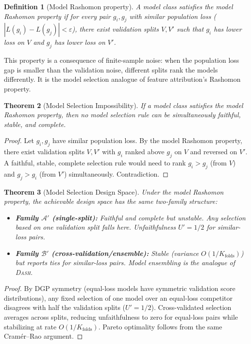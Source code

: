 \documentclass{article}
\newtheorem{theorem}{Theorem}
\newtheorem{definition}[theorem]{Definition}
\newcommand{\DASH}{\textsc{Dash}}
\begin{document}
\begin{definition}[Model Rashomon property]
A model class satisfies the \emph{model Rashomon property} if for every pair $g_i, g_j$ with similar population loss ($|L(g_i) - L(g_j)| < \varepsilon$), there exist validation splits $V, V'$ such that $g_i$ has lower loss on $V$ and $g_j$ has lower loss on $V'$.
\end{definition}

This property is a consequence of finite-sample noise: when the population loss gap is smaller than the validation noise, different splits rank the models differently. It is the model selection analogue of feature attribution's Rashomon property.

\begin{theorem}[Model Selection Impossibility]
\label{thm:model-selection}
If a model class satisfies the model Rashomon property, then no model selection rule can be simultaneously faithful, stable, and complete.
\end{theorem}

\begin{proof}
Let $g_i, g_j$ have similar population loss. By the model Rashomon property, there exist validation splits $V, V'$ with $g_i$ ranked above $g_j$ on $V$ and reversed on $V'$. A faithful, stable, complete selection rule would need to rank $g_i > g_j$ (from $V$) and $g_j > g_i$ (from $V'$) simultaneously. Contradiction.
\end{proof}

\begin{theorem}[Model Selection Design Space]
\label{thm:model-selection-ds}
Under the model Rashomon property, the achievable design space has the same two-family structure:
\begin{itemize}
    \item \textbf{Family $\mathcal{A}'$ (single-split):} Faithful and complete but unstable. Any selection based on one validation split falls here. Unfaithfulness $U' = 1/2$ for similar-loss pairs.
    \item \textbf{Family $\mathcal{B}'$ (cross-validation/ensemble):} Stable (variance $O(1/K_{\text{folds}})$) but reports ties for similar-loss pairs. Model ensembling is the analogue of \DASH{}.
\end{itemize}
\end{theorem}

\begin{proof}
By DGP symmetry (equal-loss models have symmetric validation score distributions), any fixed selection of one model over an equal-loss competitor disagrees with half the validation splits ($U' = 1/2$). Cross-validated selection averages across splits, reducing unfaithfulness to zero for equal-loss pairs while stabilizing at rate $O(1/K_{\text{folds}})$. Pareto optimality follows from the same Cram\'er--Rao argument.
\end{proof}
\end{document}
